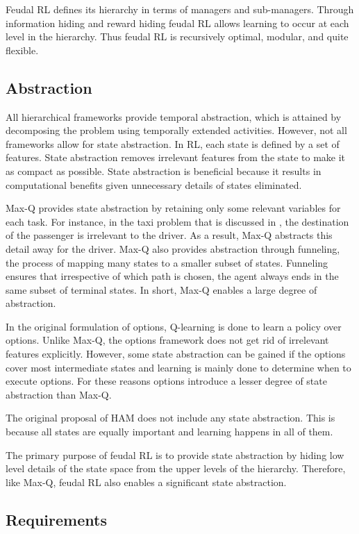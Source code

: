 Feudal RL defines its hierarchy in terms of managers and sub-managers.
Through information hiding and reward hiding feudal RL allows learning to occur at each level in the hierarchy.
Thus feudal RL is recursively optimal, modular, and quite flexible.
\subsection{Abstraction}

All hierarchical frameworks provide temporal abstraction, which is attained by decomposing the problem
using temporally extended activities. However, not all frameworks allow for state abstraction.
In RL, each state is defined by a set of features. State abstraction removes irrelevant features from
the state to make it as compact as possible. State abstraction is beneficial because it results in computational benefits given
unnecessary details of states eliminated.

Max-Q provides state abstraction by retaining only some relevant variables for each task.
For instance, in the taxi problem that is discussed in \cite{Dietterich},
the destination of the passenger is irrelevant to the driver.
As a result, Max-Q abstracts this detail away for the driver.
Max-Q also provides abstraction through funneling,
the process of mapping many states to a smaller subset of states.
Funneling ensures that irrespective of which path is chosen,
the agent always ends in the same subset of terminal states.
In short, Max-Q enables a large degree of abstraction.

In the original formulation of options, Q-learning is done to learn a policy over options.
Unlike Max-Q, the options framework does not get rid of irrelevant features explicitly.
However, some state abstraction can be gained if the options cover most intermediate states
and learning is mainly done to determine when to execute options.
For these reasons options introduce a lesser degree of state abstraction than Max-Q.

The original proposal of HAM does not include any state abstraction.
This is because all states are equally important and learning happens in all of them.

The primary purpose of feudal RL is to provide state abstraction by hiding low level details
of the state space from the upper levels of the hierarchy. Therefore, like Max-Q, feudal RL
also enables a significant state abstraction.

\subsection{Requirements}

